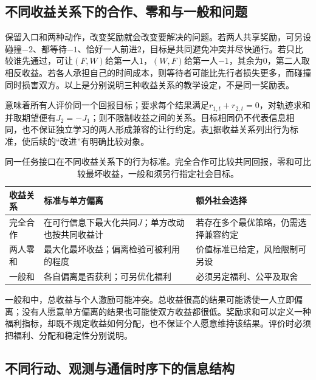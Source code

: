 \subsection{不同收益关系下的合作、零和与一般和问题}
\label{sec:rl-multi-agent-payoffs}

保留入口和两种动作，改变奖励就会改变要解决的问题。若两人共享奖励，可另设碰撞$-2$、都等待$-1$、恰好一人前进$2$，目标是共同避免冲突并尽快通行。若只比较谁先通过，可让$(F,W)$给第一人$1$，$(W,F)$给第一人$-1$，其余为$0$，第二人取相反收益。若各人承担自己的时间成本，则等待者可能比先行者损失更多，而碰撞同时损害双方。以上是分别说明三种收益关系的教学设定，不是同一奖励表。

意味着所有人评价同一个回报目标；要求每个结果满足$r_{1,t}+r_{2,t}=0$，对轨迹求和并取期望便有$J_2=-J_1$；则不限制收益之间的关系。目标相同仍不代表信息相同，也不保证独立学习的两人形成兼容的让行约定。表\ref{tab:rl-multi-agent-payoffs}据收益关系列出行为标准，使后续的“改进”有明确比较对象。

\begin{table}[htbp]
 \centering
 \begin{tabularx}{\linewidth}{@{}l >{\raggedright\arraybackslash}X >{\raggedright\arraybackslash}X@{}}
 \toprule
 收益关系 & 标准与单方偏离 & 额外社会选择\\
 \midrule
 完全合作 & 在可行信息下最大化共同$J$；单方改动也按共同收益计 & 若存在多个最优策略，仍需选择兼容约定\\
 两人零和 & 最大化最坏收益；偏离检验可被利用的程度 & 价值标准已给定，风险限制可另设\\
 一般和 & 各自偏离是否获利；可另优化福利 & 必须另定福利、公平及取舍\\
 \bottomrule
 \end{tabularx}
 \caption{同一任务接口在不同收益关系下的行为标准。完全合作可比较共同回报，零和可比较最坏收益，一般和须另行指定社会目标。}
 \label{tab:rl-multi-agent-payoffs}
\end{table}

一般和中，总收益与个人激励可能冲突。总收益很高的结果可能诱使一人立即偏离；没有人愿意单方偏离的结果也可能使双方收益都很低。奖励求和可以定义一种福利指标，却既不规定收益如何分配，也不保证个人愿意维持该结果。评价时必须把福利、分配和稳定性分别说明。

\subsection{不同行动、观测与通信时序下的信息结构}
\label{sec:rl-multi-agent-information}

